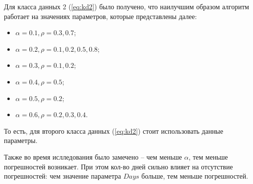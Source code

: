 Для класса данных 2 (\ref{eq:kd2}) было получено, что наилучшим образом алгоритм работает на значениях параметров, которые представлены далее:
\begin{itemize}
	\item $\alpha = 0.1, \rho = 0.3, 0.7$;
	\item $\alpha = 0.2, \rho = 0.1, 0.2, 0.5, 0.8$;
	\item $\alpha = 0.3, \rho = 0.1, 0.2$;
	\item $\alpha = 0.4, \rho = 0.5$;
	\item $\alpha = 0.5, \rho = 0.2$;
	\item $\alpha = 0.6, \rho = 0.2, 0.3, 0.4$.
\end{itemize} 
То есть, для второго класса данных (\ref{eq:kd2}) стоит использовать данные параметры.

Также во время ислледования было замечено -- чем меньше $\alpha$, тем меньше погрешностей возникает. При этом кол-во дней сильно влияет на отсутствие погрешностей: чем значение параметра $Days$ больше, тем меньше погрешностей.
